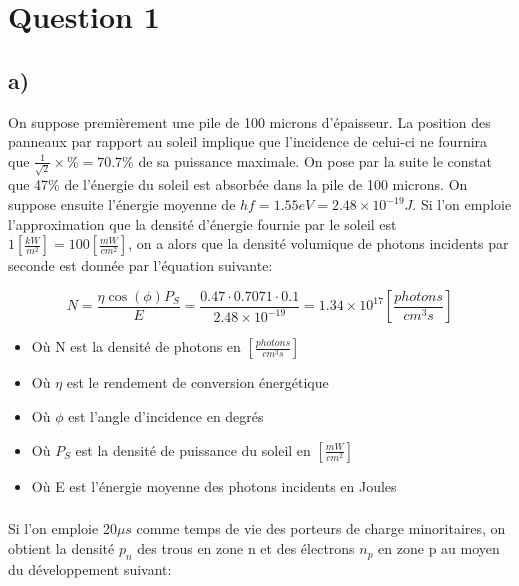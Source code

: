 



\label{s:experimentation}
\chapter*{Question 1}
\section{a)}

On suppose premièrement une pile de 100 microns d'épaisseur. La position des panneaux par rapport au soleil implique que l'incidence de celui-ci ne fournira que $\frac{1}{\sqrt{2}}\times\% = 70.7\%$ de sa puissance maximale. On pose par la suite le constat que 47\% de l'énergie du soleil est absorbée dans la pile de 100 microns. On suppose ensuite l'énergie moyenne de $hf = 1.55eV = 2.48 \times 10^{-19} J$. Si l'on emploie l'approximation que la densité d'énergie fournie par le soleil est $1\left[\frac{kW}{m^2}\right] = 100\left[\frac{mW}{cm^2}\right]$, on a alors que la densité volumique de photons incidents par seconde est donnée par l'équation suivante:

\begin{equation}
\label{eq0}
N = \frac{\eta \cos(\phi)P_S}{E} = \frac{0.47 \cdot 0.7071 \cdot 0.1}{2.48 \times 10^{-19}} = 1.34\times 10^{17} \left[\frac{photons}{cm^3 s }\right]
\end{equation}
\begin{itemize}
\item Où N est la densité de photons en $\left[\frac{photons}{cm^3 s }\right]$
\item Où $\eta$ est le rendement de conversion énergétique
\item Où $\phi$ est l'angle d'incidence en degrés
\item Où $P_S$ est la densité de puissance du soleil en $\left[\frac{mW}{cm^2}\right]$
\item Où E est l'énergie moyenne des photons incidents en Joules
\end{itemize}

\paragraph{}Si l'on emploie 20$\mu s$ comme temps de vie des porteurs de charge minoritaires, on obtient la densité $p_n$ des trous en zone n et des électrons $n_p$ en zone p au moyen du développement suivant:

